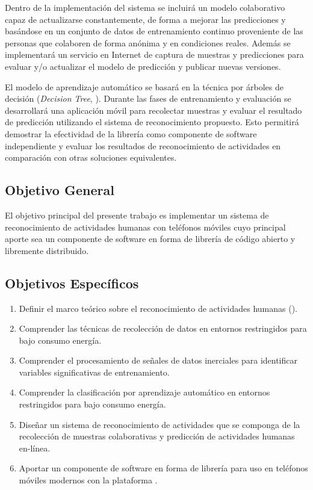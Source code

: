 Dentro de la implementación del sistema  se incluirá un
modelo colaborativo capaz de actualizarse constantemente, de forma
a mejorar las predicciones y basándose en un conjunto de datos de
entrenamiento continuo proveniente de las personas que colaboren de
forma anónima y en condiciones reales. Además se implementará un servicio
en Internet de captura de muestras y predicciones para evaluar y/o
actualizar el modelo de predicción y publicar nuevas versiones. 

El modelo de aprendizaje automático se basará en la técnica por árboles
de decisión (\emph{Decision Tree}, ). Durante las fases
de entrenamiento y evaluación se desarrollará una aplicación móvil
para recolectar muestras y evaluar el resultado de predicción utilizando
el sistema de reconocimiento propuesto. Esto permitirá demostrar la
efectividad de la librería como componente de software independiente
y evaluar los resultados de reconocimiento de actividades en comparación
con otras soluciones equivalentes. 

\subsection{Objetivo General}

\label{sec13:objetivo-general}El objetivo principal del presente
trabajo es implementar un sistema de reconocimiento de actividades
humanas con teléfonos móviles cuyo principal aporte sea un componente
de software en forma de librería de código abierto y libremente distribuido.

\subsection{Objetivos Específicos}

\label{sec13:objetivos-especuxedficos}
\begin{enumerate}
\item \label{enu:obe1}Definir el marco teórico sobre el reconocimiento
de actividades humanas (). 
\item \label{enu:obe2}Comprender las técnicas de recolección de datos en
entornos restringidos para bajo consumo energía. 
\item \label{enu:obe3}Comprender el procesamiento de señales de datos inerciales
para identificar variables significativas de entrenamiento. 
\item \label{enu:obe4}Comprender la clasificación por aprendizaje automático
en entornos restringidos para bajo consumo energía. 
\item \label{enu:obe5}Diseñar un sistema de reconocimiento de actividades
que se componga de la recolección de muestras colaborativas y predicción
de actividades humanas en-línea. 
\item \label{enu:obe6}Aportar un componente de software en forma de librería
para uso en teléfonos móviles modernos con la plataforma \emph{}. 
\end{enumerate}


